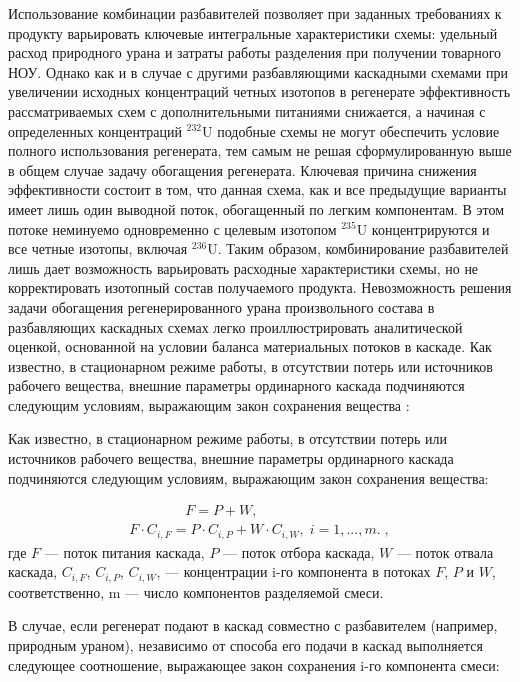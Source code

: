Использование комбинации разбавителей позволяет при заданных требованиях к продукту варьировать ключевые интегральные характеристики схемы: удельный расход природного урана и затраты работы разделения при получении товарного НОУ. Однако как и в случае с другими разбавляющими каскадными схемами при увеличении исходных концентраций четных изотопов в регенерате эффективность рассматриваемых схем с дополнительными питаниями снижается, а начиная с определенных концентраций $^{232}$U подобные схемы не могут обеспечить условие полного использования регенерата, тем самым не решая сформулированную выше в общем случае задачу обогащения регенерата. Ключевая причина снижения эффективности состоит в том, что данная схема, как и все предыдущие варианты имеет лишь один выводной поток, обогащенный по легким компонентам. В этом потоке неминуемо одновременно с целевым изотопом $^{235}$U концентрируются и все четные изотопы, включая $^{236}$U. Таким образом, комбинирование разбавителей лишь дает возможность варьировать расходные характеристики схемы, но не корректировать изотопный состав получаемого продукта.
Невозможность решения задачи обогащения регенерированного урана произвольного состава в разбавляющих каскадных схемах легко проиллюстрировать аналитической оценкой, основанной на условии баланса материальных потоков в каскаде. 
Как известно, в стационарном режиме работы, в отсутствии потерь или источников рабочего вещества, внешние параметры ординарного каскада подчиняются следующим условиям, выражающим закон сохранения вещества \cite{sulaberidzeTeoriyaKaskadovDlya2011}:


Как известно, в стационарном режиме работы, в отсутствии потерь или источников рабочего вещества, внешние параметры ординарного каскада подчиняются следующим условиям, выражающим закон сохранения вещества:
				  
\begin{equation} \label{EQ__1} 
  \begin{array}{l} {\quad \quad \quad \quad F=P+W,} \\ {F \cdot C_{i,F} =P \cdot C_{i,P} +W \cdot C_{i,W} ,\; i=1,...,m. \; ,} \end{array}
\end{equation} 
где $F$ --- поток питания каскада, $P$ --- поток отбора каскада, $W$ --- поток отвала каскада, $C_{i,F}$, $C_{i,P}$, $C_{i,W}$, --- концентрации i-го компонента в потоках $F$, $P$ и $W$, соответственно, m --- число компонентов разделяемой смеси.

В случае, если регенерат подают в каскад совместно с разбавителем (например, природным ураном), независимо от способа его подачи в каскад выполняется следующее соотношение, выражающее закон сохранения i-го компонента смеси:


